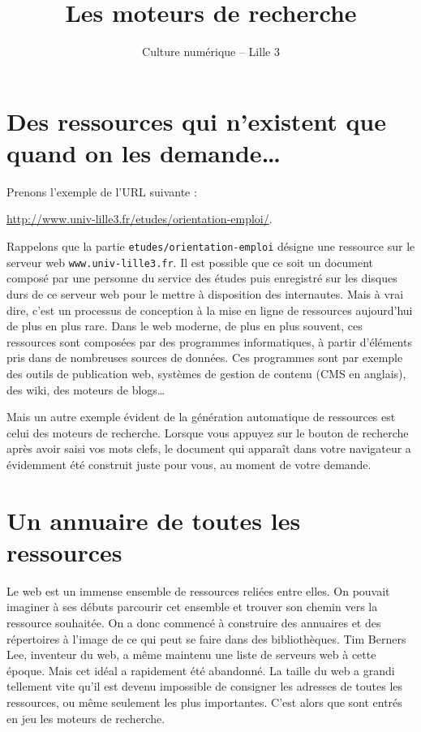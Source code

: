 \documentclass[12pt]{article}
\title{Les moteurs de recherche}
\author {Culture numérique -- Lille 3}
\date{}
\begin{document}
\maketitle

\section*{Des ressources qui n'existent que quand on les demande\ldots{}}
\label{sec:orgheadline1}
Prenons l'exemple de l'URL suivante :

\begin{center}
  {\url{http://www.univ-lille3.fr/etudes/orientation-emploi/}.}
\end{center}

 Rappelons que la
partie \texttt{etudes/orientation-emploi} désigne une ressource sur le
serveur web \texttt{www.univ-lille3.fr}.  Il est possible que ce soit un
document composé par une personne du service des études puis
enregistré sur les disques durs de ce serveur web pour le mettre à
disposition des internautes. Mais à vrai dire, c'est un processus de
conception à la mise en ligne de ressources aujourd'hui de plus en
plus rare.  Dans le web moderne, de plus en plus souvent, ces
ressources sont composées par des programmes informatiques, à partir
d'éléments pris dans de nombreuses sources de données. Ces programmes
sont par exemple des outils de publication web, systèmes de gestion de
contenu (CMS en anglais), des wiki, des moteurs de blogs\ldots{}

Mais un autre exemple évident de la génération automatique de
ressources est celui des moteurs de recherche. Lorsque vous appuyez
sur le bouton de recherche après avoir saisi vos mots clefs, le
document qui apparaît dans votre navigateur a évidemment été construit
juste pour vous, au moment de votre demande.

\section*{Un annuaire de toutes les ressources}
\label{sec:orgheadline2}
Le web est un immense ensemble de ressources reliées entre
elles. On pouvait imaginer à ses débuts parcourir cet ensemble et
trouver son chemin vers la ressource souhaitée. On a donc commencé à
construire des annuaires et des répertoires à l'image de ce qui peut
se faire dans des bibliothèques. Tim Berners Lee, inventeur du web, a
même maintenu une liste de serveurs web à cette époque. Mais cet idéal
a rapidement été abandonné.  La taille du web a grandi tellement vite
qu'il est devenu impossible de consigner les adresses de toutes les
ressources, ou même seulement les plus importantes. C'est alors que
sont entrés en jeu les moteurs de recherche.
\end{document}
